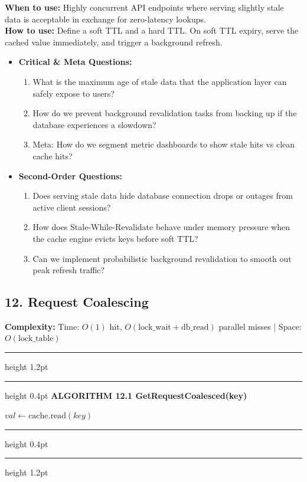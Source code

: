\documentclass[11pt,a4paper]{article}
\newenvironment{textbookalgo}[2]{%
  \par\addvspace{1.2em}\noindent
  \hrule height 1.2pt
  \vspace{1.5pt}
  \hrule height 0.4pt
  \vspace{5pt}
  {\noindent\large\bfseries\sffamily ALGORITHM #1 \quad #2}
  \par\vspace{5pt}
  \RestyleAlgo{plain}
}{%
  \par\vspace{4pt}
  \hrule height 0.4pt
  \vspace{1.5pt}
  \hrule height 1.2pt
  \par\addvspace{1.2em}
}
\theoremstyle{definition}
\begin{document}
\noindent
\textbf{When to use:} Highly concurrent API endpoints where serving slightly stale data is acceptable in exchange for zero-latency lookups.\\
\textbf{How to use:} Define a soft TTL and a hard TTL. On soft TTL expiry, serve the cached value immediately, and trigger a background refresh.
\begin{itemize}[leftmargin=*]
  \item[] \textbf{Critical \& Meta Questions:}
  \begin{enumerate}
  \item What is the maximum age of stale data that the application layer can safely expose to users?
  \item How do we prevent background revalidation tasks from backing up if the database experiences a slowdown?
  \item Meta: How do we segment metric dashboards to show stale hits vs clean cache hits?
  \end{enumerate}
  \item[] \textbf{Second-Order Questions:}
  \begin{enumerate}
  \item Does serving stale data hide database connection drops or outages from active client sessions?
  \item How does Stale-While-Revalidate behave under memory pressure when the cache engine evicts keys before soft TTL?
  \item Can we implement probabilistic background revalidation to smooth out peak refresh traffic?
  \end{enumerate}
\end{itemize}
\medskip

\clearpage
\subsection{12. Request Coalescing}

\noindent
\textbf{Complexity:} Time: $O(1)$ hit, $O(\text{lock\_wait} + \text{db\_read})$ parallel misses | Space: $O(\text{lock\_table})$
\smallskip

\begin{textbookalgo}{12.1}{GetRequestCoalesced(key)}
\begin{algorithm}[H]
$val \leftarrow \text{cache.read}(key)$\;
\end{algorithm}
\end{textbookalgo}
\end{document}
